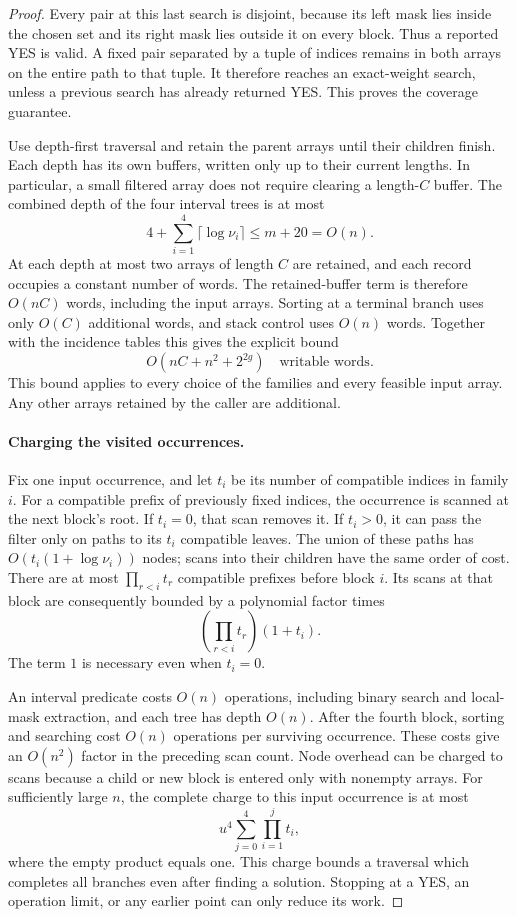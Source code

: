 \begin{proof}
Every pair at this last search is disjoint, because its left mask lies
inside the chosen set and its right mask lies outside it on every
block. Thus a reported YES is valid. A fixed pair separated by a tuple
of indices remains in both arrays on the entire path to that tuple.
It therefore reaches an exact-weight search, unless a previous search
has already returned YES. This proves the coverage guarantee.

Use depth-first traversal and retain the parent arrays until their
children finish. Each depth has its own buffers, written only up to
their current lengths. In particular, a small filtered array does
not require clearing a length-$C$ buffer. The combined depth of the
four interval trees is at most
\[
 4+\sum_{i=1}^4\lceil\log\nu_i\rceil\le m+20=O(n).
\]
At each depth at most two arrays of length $C$ are retained, and each
record occupies a constant number of words. The retained-buffer term
is therefore $O(nC)$ words, including the input arrays. Sorting at a
terminal branch uses only $O(C)$ additional words, and stack control
uses $O(n)$ words. Together with the incidence tables this gives the
explicit bound
\begin{equation}\label{sep:workspace}
 O(nC+n^2+2^{2g})\quad\text{writable words}.
\end{equation}
This bound applies to every choice of the families and every feasible
input array. Any other arrays retained by the caller are additional.

\paragraph{Charging the visited occurrences.}
Fix one input occurrence, and let $t_i$ be its number of compatible
indices in family $i$. For a compatible prefix of previously fixed
indices, the occurrence is scanned at the next block's root. If
$t_i=0$, that scan removes it. If $t_i>0$, it can pass the filter only
on paths to its $t_i$ compatible leaves. The union of these paths has
$O(t_i(1+\log\nu_i))$ nodes; scans into their children have the same
order of cost. There are at most $\prod_{r<i}t_r$ compatible
prefixes before block $i$. Its scans at that block are consequently
bounded by a polynomial factor times
\[
 \left(\prod_{r<i}t_r\right)(1+t_i).
\]
The term $1$ is necessary even when $t_i=0$.

An interval predicate costs $O(n)$ operations, including binary
search and local-mask extraction, and each tree has depth $O(n)$.
After the fourth block, sorting and searching cost $O(n)$ operations
per surviving occurrence. These costs give an $O(n^2)$ factor in
the preceding scan count.
Node overhead can be charged to scans because a child or new block is
entered only with nonempty arrays. For sufficiently large $n$, the
complete charge to this input occurrence is at most
\begin{equation}\label{sep:charge}
 u^4\sum_{j=0}^4\prod_{i=1}^j t_i,
\end{equation}
where the empty product equals one. This charge bounds a traversal
which completes all branches even after finding a solution. Stopping
at a YES, an operation limit, or any earlier point can only reduce
its work.


\end{proof}
